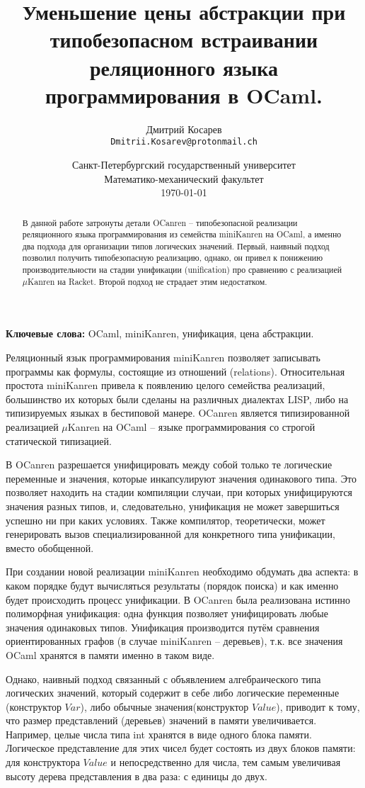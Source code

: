 \documentclass[10pt]{article}
\title{Уменьшение цены абстракции при типобезопасном встраивании реляционного языка программирования в OCaml.}
\author{
        Дмитрий Косарев\\ \texttt{Dmitrii.Kosarev@protonmail.ch}
}
\date{
  Санкт-Петербургский государственный университет\\
  Математико-механический факультет\\
  \today
}
\begin{document}
\maketitle

\begin{abstract}
В данной работе затронуты детали OCanren -- типобезопасной реализации реляционного языка программирования
из семейства miniKanren на OCaml, а именно два подхода для организации типов логических значений. Первый,
наивный подход позволил получить типобезопасную реализацию, однако, он привел к понижению производительности
на стадии унификации (unification) про сравнению с реализацией $\mu$Kanren на Racket. Второй подход не 
страдает этим недостатком.

\end{abstract}

\textbf{Ключевые слова:} OCaml, miniKanren, унификация, цена абстракции.

\vspace{5mm}

Реляционный язык программирования miniKanren позволяет записывать программы как формулы, состоящие из отношений
(relations). Относительная простота miniKanren привела к появлению целого семейства реализаций, большинство их 
которых были сделаны на различных диалектах LISP, либо на типизируемых языках в бестиповой манере. OCanren 
является типизированной реализацией $\mu$Kanren на OCaml -- языке программирования со строгой статической 
типизацией.

В OCanren разрешается унифицировать между собой только те логические переменные и значения, которые инкапсулируют
значения одинакового типа. Это позволяет находить на стадии компиляции случаи, при которых унифицируются 
значения разных типов, и, следовательно, унификация не может завершиться успешно ни при каких условиях. Также
компилятор, теоретически, может генерировать вызов специализированной для конкретного типа унификации, вместо 
обобщенной.

При создании новой реализации miniKanren необходимо обдумать два аспекта: в каком порядке будут вычисляться 
результаты (порядок поиска) и как именно будет происходить процесс унификации. В OCanren была реализована истинно 
полиморфная унификация: одна функция позволяет унифицировать любые значения одинаковых типов. Унификация производится
путём сравнения ориентированных графов (в случае miniKanren -- деревьев), т.к. все значения OCaml хранятся в 
памяти именно в таком виде.

Однако, наивный подход связанный с объявлением алгебраического типа логических значений, который содержит в себе 
либо логические переменные (конструктор $Var$), либо обычные значения(конструктор $Value$), приводит к тому, что 
размер представлений (деревьев) значений в памяти увеличивается. 
Например, целые числа типа int хранятся в виде одного блока памяти. Логическое представление для этих чисел
будет состоять из двух блоков памяти: для конструктора $Value$ и непосредственно для числа, тем самым увеличивая 
высоту дерева представления в два раза: с единицы до двух.
\end{document}

